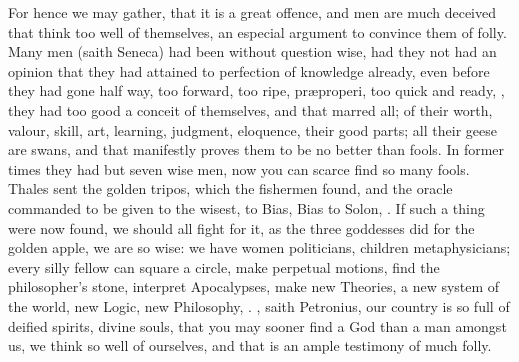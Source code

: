 {For hence we may gather, that it is a great offence, and men are much
deceived that think too well of themselves, an especial argument to
convince them of folly. Many men (saith Seneca) had been without
question wise, had they not had an opinion that they had attained to
perfection of knowledge already, even before they had gone half way,
too forward, too ripe, pr\ae{}properi, too quick and ready, , they had too good a conceit of
themselves, and that marred all; of their worth, valour, skill, art,
learning, judgment, eloquence, their good parts; all their geese are
swans, and that manifestly proves them to be no better than fools. In
former times they had but seven wise men, now you can scarce find so
many fools. Thales sent the golden tripos, which the fishermen found,
and the oracle commanded to be  given to the wisest, to Bias, Bias
to Solon, \etc{}. If such a thing were now found, we should all fight for
it, as the three goddesses did for the golden apple, we are so wise: we
have women politicians, children metaphysicians; every silly fellow can
square a circle, make perpetual motions, find the philosopher's stone,
interpret Apocalypses, make new Theories, a new system of the world,
new Logic, new Philosophy, \etc{}. , saith
Petronius, our country is so full of deified spirits, divine
souls, that you may sooner find a God than a man amongst us, we think
so well of ourselves, and that is an ample testimony of much folly.

}
